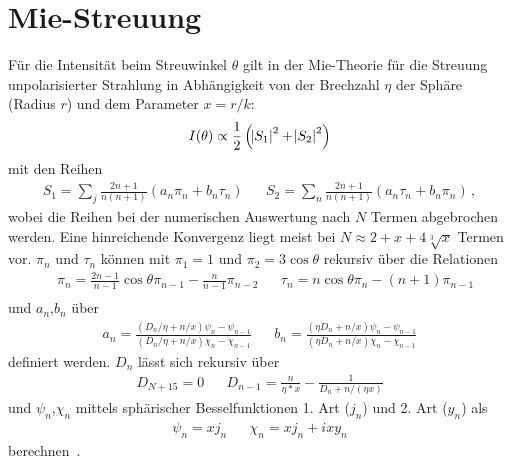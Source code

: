 \chapter{Mie-Streuung}
\label{app:mie}
Für die Intensität beim Streuwinkel $\theta$ gilt in der Mie-Theorie für die Streuung unpolarisierter Strahlung in Abhängigkeit von der Brechzahl $\eta$ der Sphäre (Radius $r$) und dem Parameter $x=r/k$:
\begin{equation}
	I(\theta)\propto\frac{1}{2}\left(\abs{S_1}^2+\abs{S_2}^2\right)
\end{equation} 
mit den Reihen
\begin{align}
	S_1=\sum_j{\frac{2n+1}{n(n+1)}(a_n\pi_n+b_n\tau_n)} &   & S_2=\sum_n{\frac{2n+1}{n(n+1)}(a_n\tau_n+b_n\pi_n)}\,, 
\end{align}
wobei die Reihen bei der numerischen Auswertung nach $N$ Termen abgebrochen werden. Eine hinreichende Konvergenz liegt meist bei $N\approx2+x+4\sqrt[3]{x}$ Termen vor.  $\pi_n$ und $\tau_n$ können mit $\pi_1=1$ und  $\pi_2=3\cos{\theta}$ rekursiv über die Relationen
\begin{align}
	  & \pi_n=\frac{2n-1}{n-1}\cos{\theta}\pi_{n-1}-\frac{n}{n-1}\pi_{n-2} &   & \tau_n=n\cos{\theta}\pi_n-(n+1)\pi_{n-1} \\
\end{align}
und $a_n$,$b_n$ über 
\begin{align}
	a_n=\frac{(D_n/\eta+n/x)\psi_n-\psi_{n-1}}{(D_n/\eta+n/x)\chi_n-\chi_{n-1}} &   &   
	b_n=\frac{(\eta D_n+n/x)\psi_n-\psi_{n-1}}{(\eta D_n+n/x)\chi_n-\chi_{n-1}}
\end{align} definiert werden. $D_n$ lässt sich rekursiv über
\begin{align}
	D_{N+15}=0 &   & D_{n-1}=\frac{n}{\eta*x}-\frac{1}{D_n+n/(\eta x)} 
\end{align}
und $\psi_n$,$\chi_n$ mittels sphärischer Besselfunktionen 1. Art ($j_n$) und 2. Art ($y_n$) als 
\begin{align}
	\psi_n=x j_n &   & \chi_n=x j_n+ixy_n 
\end{align}
berechnen~\cite{bohren2008}.

